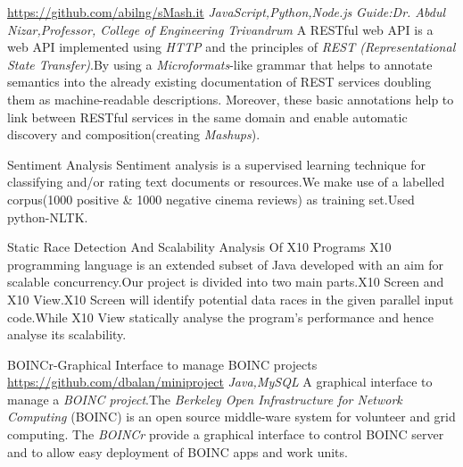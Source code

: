 \documentclass[11pt,a4paper,sans]{moderncv}
\begin{document}
{\newline \url{https://github.com/abilng/sMash.it}}
{\hfill \textit{JavaScript,Python,Node.js}}
{\newline \textit{Guide:Dr. Abdul Nizar,Professor, College of Engineering Trivandrum}}
{A RESTful web API is a web API implemented using \textit{HTTP }and the principles of \textit{REST (Representational State Transfer)}.By using  a \textit{Microformats}-like grammar that helps to annotate semantics into the already existing documentation of REST services doubling them as machine-readable descriptions. Moreover, these basic annotations help to link between RESTful services in the same domain and enable automatic discovery and composition(creating \textit{Mashups}).\newline}


{Sentiment Analysis}{}{}{}
{Sentiment analysis is a supervised learning technique for classifying and/or rating text documents or resources.We make use of a labelled corpus(1000 positive \& 1000 negative cinema reviews) as training set.Used python-NLTK.\newline}

{Static Race Detection And Scalability Analysis Of X10 Programs}{}{}{}
{X10 programming language is an extended subset of Java developed with an aim for
scalable concurrency.Our project is divided into two main parts.X10 Screen and X10 View.X10 Screen will identify potential data races in the given parallel input code.While X10 View statically analyse the program's performance and hence analyse its scalability.\newline}

{BOINCr-Graphical Interface to manage BOINC projects}
{\newline \url{https://github.com/dbalan/miniproject}}{}
{\hfill \textit{Java,MySQL}}
{A graphical interface to manage a \textit{BOINC project}.The \textit{Berkeley Open Infrastructure for Network Computing }(BOINC) is an open source middle-ware system for volunteer and grid computing. The \textit{BOINCr} provide a graphical interface to control BOINC server and to allow easy deployment of BOINC apps and work units.\newline}
\end{document}
